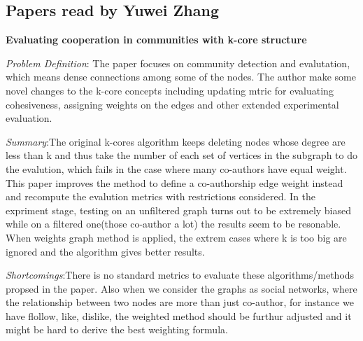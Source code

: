
\subsection{Papers read by Yuwei Zhang }
\textbf{Evaluating cooperation in communities with k-core structure}
\cite{Evaluating}
\begin{itemize*}
\item {\em Problem Definition}: The paper focuses on community detection and evalutation, which means dense connections among some of the nodes. The author make some novel changes to the k-core concepts including updating mtric for evaluating cohesiveness, assigning weights on the edges and other extended experimental evaluation.
\item {\em Summary}:The original k-cores algorithm keeps deleting nodes whose degree are less than k and thus take the number of each set of vertices in the subgraph to do the evalution, which fails in the case where many co-authors have equal weight. This paper improves the method to define a co-authorship edge weight instead and recompute the evalution metrics with restrictions considered. In the expriment stage, testing on an unfiltered graph turns out to be extremely biased while on a filtered one(those co-author a lot) the results seem to be resonable. When weights graph method is applied, the extrem cases where k is too big are ignored and the algorithm gives better results. 
\item {\em Shortcomings}:There is no standard metrics to evaluate these algorithms/methods propsed in the paper. Also when we consider the graphs as social networks, where the relationship between two nodes are more than just co-author, for instance we have flollow, like, dislike, the weighted method should be furthur adjusted and it might be hard to derive the best weighting formula.
\end{itemize*}


